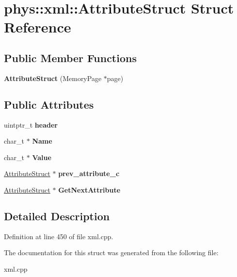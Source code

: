 \hypertarget{structphys_1_1xml_1_1AttributeStruct}{
\section{phys::xml::AttributeStruct Struct Reference}
\label{dd/dfe/structphys_1_1xml_1_1AttributeStruct}
}
\subsection*{Public Member Functions}
\begin{DoxyCompactItemize}
\item 
\hypertarget{structphys_1_1xml_1_1AttributeStruct_ae56b37b04de2de9b06f2ab62063860d0}{
{\bfseries AttributeStruct} (MemoryPage $\ast$page)}
\label{dd/dfe/structphys_1_1xml_1_1AttributeStruct_ae56b37b04de2de9b06f2ab62063860d0}

\end{DoxyCompactItemize}
\subsection*{Public Attributes}
\begin{DoxyCompactItemize}
\item 
\hypertarget{structphys_1_1xml_1_1AttributeStruct_a9fd6577532fd75614cbbeef25ebc483d}{
uintptr\_\-t {\bfseries header}}
\label{dd/dfe/structphys_1_1xml_1_1AttributeStruct_a9fd6577532fd75614cbbeef25ebc483d}

\item 
\hypertarget{structphys_1_1xml_1_1AttributeStruct_af33547ea3e8c21d16737fc7ebcb94c95}{
char\_\-t $\ast$ {\bfseries Name}}
\label{dd/dfe/structphys_1_1xml_1_1AttributeStruct_af33547ea3e8c21d16737fc7ebcb94c95}

\item 
\hypertarget{structphys_1_1xml_1_1AttributeStruct_a2a7018296eb97ef342b5230d59f6e6ee}{
char\_\-t $\ast$ {\bfseries Value}}
\label{dd/dfe/structphys_1_1xml_1_1AttributeStruct_a2a7018296eb97ef342b5230d59f6e6ee}

\item 
\hypertarget{structphys_1_1xml_1_1AttributeStruct_ad37be3bf8c8d5a469396e882af402f89}{
\hyperlink{structphys_1_1xml_1_1AttributeStruct}{AttributeStruct} $\ast$ {\bfseries prev\_\-attribute\_\-c}}
\label{dd/dfe/structphys_1_1xml_1_1AttributeStruct_ad37be3bf8c8d5a469396e882af402f89}

\item 
\hypertarget{structphys_1_1xml_1_1AttributeStruct_acbd550c08cec46228d1820957a153672}{
\hyperlink{structphys_1_1xml_1_1AttributeStruct}{AttributeStruct} $\ast$ {\bfseries GetNextAttribute}}
\label{dd/dfe/structphys_1_1xml_1_1AttributeStruct_acbd550c08cec46228d1820957a153672}

\end{DoxyCompactItemize}


\subsection{Detailed Description}


Definition at line 450 of file xml.cpp.



The documentation for this struct was generated from the following file:\begin{DoxyCompactItemize}
\item 
xml.cpp\end{DoxyCompactItemize}
